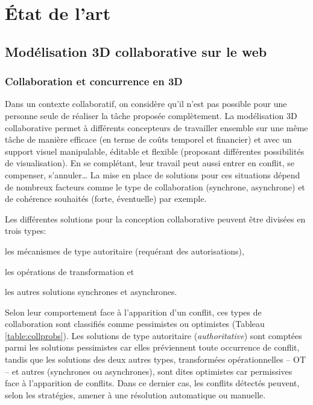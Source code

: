 \chapter{État de l'art}
\chaptertable


\section{Modélisation 3D collaborative sur le web}

\subsection{Collaboration et concurrence en 3D}
\label{sec:concurrence}
Dans un contexte collaboratif, on considère qu'il n'est pas possible pour une 
personne seule de réaliser la tâche proposée complètement. 
La modélisation 3D collaborative permet à différents concepteurs de travailler 
ensemble sur une même tâche de manière efficace (en terme de coûts temporel et 
financier) et avec un support visuel manipulable, éditable et flexible (proposant 
différentes possibilités de visualisation). 
En se complétant, leur travail peut aussi entrer en conflit, se compenser, 
s'annuler\ldots
La mise en place de solutions pour ces situations dépend de nombreux facteurs 
comme le type de collaboration (synchrone, asynchrone) et de cohérence souhaités 
(forte, éventuelle) par exemple.

Les différentes solutions pour la conception collaborative peuvent être divisées en 
trois types: 
\begin{enumerate*}[label=(\roman*)]
	\item les mécanismes de type autoritaire (requérant des autorisations),
	\item les opérations de transformation et 
	\item les autres solutions synchrones et asynchrones.
\end{enumerate*}
Selon leur comportement face à l'apparition d'un conflit, ces types de 
collaboration sont classifiés comme pessimistes ou optimistes (Tableau 
\ref{table:collprobs}). Les solutions de type autoritaire (\og \textit{authoritative}\fg{}) 
sont comptées parmi les solutions pessimistes car elles préviennent toute 
occurrence de conflit, tandis que les solutions des deux autres types,
transformées opérationnelles -- \gls{OT} -- et autres (synchrones ou asynchrones), 
sont dites optimistes car permissives face à l'apparition de conflits. 
Dans ce dernier cas, les conflits détectés peuvent, selon les stratégies, amener à 
une résolution automatique ou manuelle.

